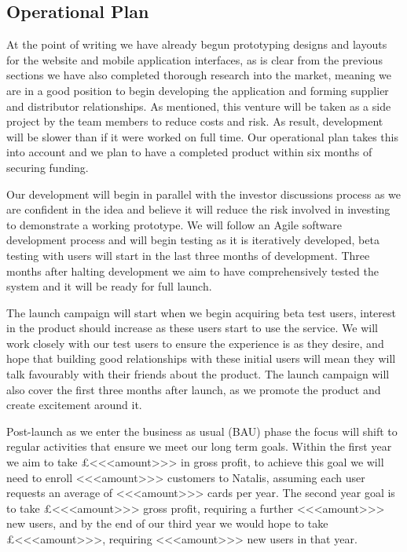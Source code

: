 \documentclass[10pt,a4paper]{article}
\begin{document}
\subsection*{Operational Plan}
At the point of writing we have already begun prototyping designs and layouts for the website and mobile application interfaces, as is clear from the previous sections we have also completed thorough research into the market, meaning we are in a good position to begin developing the application and forming supplier and distributor relationships. As mentioned, this venture will be taken as a side project by the team members to reduce costs and risk. As result, development will be slower than if it were worked on full time. Our operational plan takes this into account and we plan to have a completed product within six months of securing funding.

Our development will begin in parallel with the investor discussions process as we are confident in the idea and believe it will reduce the risk involved in investing to demonstrate a working prototype. We will follow an Agile software development process and will begin testing as it is iteratively developed, beta testing with users will start in the last three months of development. Three months after halting development we aim to have comprehensively tested the system and it will be ready for full launch.

The launch campaign will start when we begin acquiring beta test users, interest in the product should increase as these users start to use the service. We will work closely with our test users to ensure the experience is as they desire, and hope that building good relationships with these initial users will mean they will talk favourably with their friends about the product. The launch campaign will also cover the first three months after launch, as we promote the product and create excitement around it.

Post-launch as we enter the business as usual (BAU) phase the focus will shift to regular activities that ensure we meet our long term goals. Within the first year we aim to take \pounds<<<amount>>> in gross profit, to achieve this goal we will need to enroll <<<amount>>> customers to Natalis, assuming each user requests an average of <<<amount>>> cards per year. The second year goal is to take \pounds<<<amount>>> gross profit, requiring a further <<<amount>>> new users, and by the end of our third year we would hope to take \pounds<<<amount>>>, requiring <<<amount>>> new users in that year.
\end{document}
